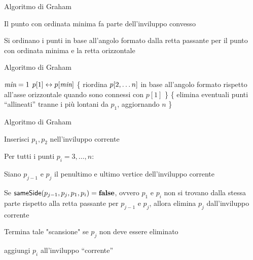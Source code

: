 \begin{frame}{Algoritmo di Graham}

\vspace{-9pt}
\begin{myboxtitle}[Fase 1]
\BIL
\item Il punto con ordinata minima fa parte dell’inviluppo convesso
\item Si ordinano i punti in base all’angolo formato dalla retta passante per il punto con ordinata minima e la retta orizzontale
\EIL
\end{myboxtitle}


\end{frame}

\begin{frame}{Algoritmo di Graham}

\begin{Procedure}
\caption[A]{\Stack \graham($\Point[\,]\ p$, \INTEGER $n$)}
\INTEGER $\textit{min} = 1$\;
$p[1] \leftrightarrow p[\textit{min}]$\;
\{ riordina $p[2, \ldots n]$ in base all'angolo formato rispetto all'asse orizzontale quando sono connessi con $p[1]$ \}\;
\{ elimina eventuali punti “allineati” tranne i più lontani da $p_1$, aggiornando $n$ \}\;
[...]\;
\end{Procedure}


\end{frame}

\begin{frame}{Algoritmo di Graham}

\vspace{-9pt}
\begin{myboxtitle}[Fase 2]
\BIL
\item Inserisci $p_1,p_2$ nell'inviluppo corrente
\item Per tutti i punti $p_i = 3, \ldots, n$:
\BIL
\item Siano $p_{j-1}$ e $p_j$ il penultimo e ultimo vertice dell'inviluppo corrente
\item Se $\textsf{sameSide}(p_{j-1}, p_{j}, p_1, p_i) = \FALSE$, ovvero $p_1$ e $p_i$ non si trovano dalla stessa parte rispetto alla retta passante per $p_{j-1}$ e $p_j$, allora elimina $p_j$ dall'inviluppo corrente 
\item Termina tale "scansione" se $p_j$ non deve essere eliminato
\item aggiungi $p_i$ all'inviluppo “corrente”
\EIL
\EIL
\end{myboxtitle}

\end{frame}

